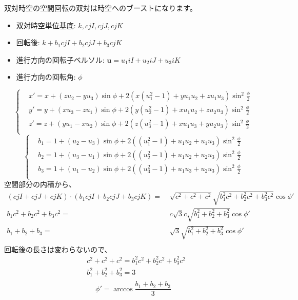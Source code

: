 \documentclass[a4paper,12pt,notitlepage]{jsreport}
\begin{document}
双対時空の空間回転の双対は時空へのブーストになります。
\begin{itemize}
  \item 双対時空単位基底: $ k, c jI, c jJ, c jK $
  \item 回転後: $ k + b_1 c jI + b_2 c jJ + b_3 c jK $
  \item 進行方向の回転子ベルソル: $ \bm{u} = u_1 iI + u_2 iJ + u_3 iK $
  \item 進行方向の回転角: $ \phi $
\end{itemize}
\begin{equation}
  \left\{
    \begin{aligned}
      &x' = x + (z u_2 - y u_3) \sin \phi + 2 (x (u_1^2 - 1) + y u_1 u_2 + z u_1 u_3) \sin^2 \frac{\phi}{2} \\
      &y' = y + (x u_3 - z u_1) \sin \phi + 2 (y (u_2^2 - 1) + x u_1 u_2 + z u_2 u_3) \sin^2 \frac{\phi}{2} \\
      &z' = z + (y u_1 - x u_2) \sin \phi + 2 (z (u_3^2 - 1) + x u_1 u_3 + y u_2 u_3) \sin^2 \frac{\phi}{2} \\
    \end{aligned}
  \right.
\end{equation}
\begin{equation}
  \left\{
    \begin{aligned}
      &b_1 = 1 + (u_2 - u_3) \sin \phi + 2 ((u_1^2 - 1) + u_1 u_2 + u_1 u_3) \sin^2 \frac{\phi}{2} \\
      &b_2 = 1 + (u_3 - u_1) \sin \phi + 2 ((u_2^2 - 1) + u_1 u_2 + u_2 u_3) \sin^2 \frac{\phi}{2} \\
      &b_3 = 1 + (u_1 - u_2) \sin \phi + 2 ((u_3^2 - 1) + u_1 u_3 + u_2 u_3) \sin^2 \frac{\phi}{2} \\
    \end{aligned}
  \right.
\end{equation}
空間部分の内積から、
\begin{equation}
  \begin{split}
    (c jI + c jJ + c jK) \cdot (b_1 c jI + b_2 c jJ + b_3 c jK)
    = ~ & \sqrt{c^2 + c^2 + c^2} \sqrt{b_1^2 c^2 + b_2^2 c^2 + b_3^2 c^2} \cos \phi' \\
    b_1 c^2 + b_2 c^2 + b_3 c^2
    = ~ & c \sqrt{3} c \sqrt{b_1^2 + b_2^2 + b_3^2} \cos \phi' \\
    b_1 + b_2 + b_3
    = ~ & \sqrt{3} \sqrt{b_1^2 + b_2^2 + b_3^2} \cos \phi' \\
  \end{split}
\end{equation}
回転後の長さは変わらないので、
\begin{equation}
  \begin{split}
    & c^2 + c^2 + c^2 = b_1^2 c^2 + b_2^2 c^2 + b_3^2 c^2 \\
    & b_1^2 + b_2^2 + b_3^2 = 3 \\
  \end{split}
\end{equation}
\begin{equation}
  \phi' = \arccos \frac{b_1 + b_2 + b_3}{3}
\end{equation}
\end{document}
